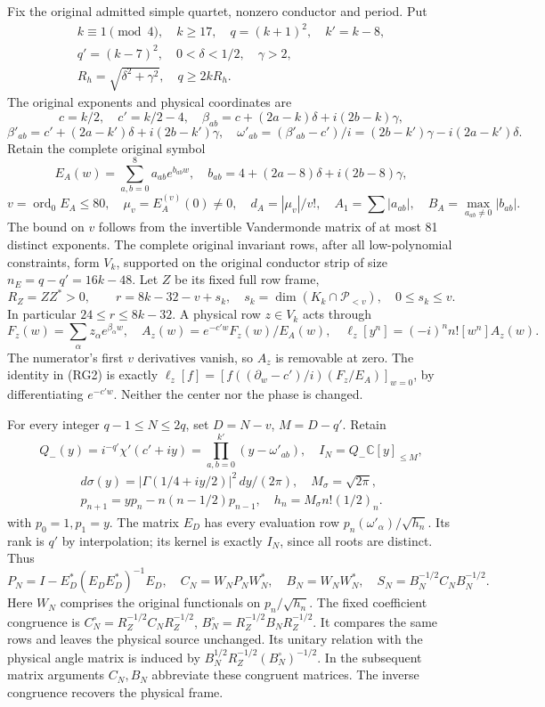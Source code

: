 \documentclass[11pt]{article}
\begin{document}
Fix the original admitted simple quartet, nonzero conductor and period. Put \[
\begin{gathered}
k\equiv1\pmod4,\quad k\ge17,\quad q=(k+1)^2,\quad k'=k-8,\\
q'=(k-7)^2,\quad0<\delta<1/2,\quad\gamma>2,\\
R_h=\sqrt{\delta^2+\gamma^2},\quad q\ge2kR_h.
\end{gathered}
\tag{RG1}
\] The original exponents and physical coordinates are \[
c=k/2,\quad c'=k/2-4,\quad
\beta_{ab}=c+(2a-k)\delta+i(2b-k)\gamma,
\] \[
\beta'_{ab}=c'+(2a-k')\delta+i(2b-k')\gamma,\quad
\omega'_{ab}=(\beta'_{ab}-c')/i
=(2b-k')\gamma-i(2a-k')\delta.
\] Retain the complete original symbol \[
E_A(w)=\sum_{a,b=0}^{8}a_{ab}e^{b_{ab}w},\quad
b_{ab}=4+(2a-8)\delta+i(2b-8)\gamma,
\] \[
v=\operatorname{ord}_0E_A\le80,\quad\mu_v=E_A^{(v)}(0)\ne0,
\quad d_A=|\mu_v|/v!,\quad A_1=\sum|a_{ab}|,\quad
B_A=\max_{a_{ab}\ne0}|b_{ab}|.
\] The bound on \(v\) follows from the invertible Vandermonde matrix of at most 81 distinct exponents. The complete original invariant rows, after all low-polynomial constraints, form \(V_k\), supported on the original conductor strip of size \(n_E=q-q'=16k-48\). Let \(Z\) be its fixed full row frame, \[
R_Z=ZZ^*>0,\qquad r=8k-32-v+s_k,\quad
s_k=\dim(K_k\cap\mathcal P_{<v}),\quad0\le s_k\le v.
\] In particular \(24\le r\le8k-32\). A physical row \(z\in V_k\) acts through \[
F_z(w)=\sum_\alpha z_\alpha e^{\beta_\alpha w},\quad
A_z(w)=e^{-c'w}F_z(w)/E_A(w),\quad
\ell_z[y^n]=(-i)^n n![w^n]A_z(w).
\tag{RG2}
\] The numerator's first \(v\) derivatives vanish, so \(A_z\) is removable at zero. The identity in (RG2) is exactly \(\ell_z[f]=[f((\partial_w-c')/i)(F_z/E_A)]_{w=0}\), by differentiating \(e^{-c'w}\). Neither the center nor the phase is changed.

For every integer \(q-1\le N\le2q\), set \(D=N-v\), \(M=D-q'\). Retain \[
Q_-(y)=i^{-q'}\chi'(c'+iy)=\prod_{a,b=0}^{k'}(y-\omega'_{ab}),
\quad I_N=Q_-\mathbb C[y]_{\le M},
\] \[
\begin{gathered}
d\sigma(y)=|\Gamma(1/4+iy/2)|^2\,dy/(2\pi),\quad M_\sigma=\sqrt{2\pi},\\
p_{n+1}=yp_n-n(n-1/2)p_{n-1},\quad h_n=M_\sigma n!(1/2)_n.
\end{gathered}
\] with \(p_0=1,p_1=y\). The matrix \(E_D\) has every evaluation row \(p_n(\omega'_\alpha)/\sqrt{h_n}\). Its rank is \(q'\) by interpolation; its kernel is exactly \(I_N\), since all roots are distinct. Thus \[
P_N=I-E_D^*(E_DE_D^*)^{-1}E_D,\quad
C_N=W_NP_NW_N^*,\quad B_N=W_NW_N^*,\quad
S_N=B_N^{-1/2}C_NB_N^{-1/2}.
\tag{RG3}
\] Here \(W_N\) comprises the original functionals on \(p_n/\sqrt{h_n}\). The fixed coefficient congruence is \(C_N^\circ=R_Z^{-1/2}C_NR_Z^{-1/2}\), \(B_N^\circ=R_Z^{-1/2}B_NR_Z^{-1/2}\). It compares the same rows and leaves the physical source unchanged. Its unitary relation with the physical angle matrix is induced by \(B_N^{1/2}R_Z^{-1/2}(B_N^\circ)^{-1/2}\). In the subsequent matrix arguments \(C_N,B_N\) abbreviate these congruent matrices. The inverse congruence recovers the physical frame.
\end{document}
